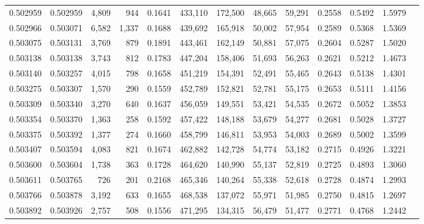 \begin{tabular}{rrrrrrrrrrrrr}
0.502959 & 0.502959 & 4,809 &   944 &                                     0.1641 & 433,110 & 172,500 &  48,665 &  59,291 & 0.2558 & 0.5492 & 1.5979 \\
0.502966 & 0.503071 & 6,582 & 1,337 &                                     0.1688 & 439,692 & 165,918 &  50,002 &  57,954 & 0.2589 & 0.5368 & 1.5369 \\
0.503075 & 0.503131 & 3,769 &   879 &                                     0.1891 & 443,461 & 162,149 &  50,881 &  57,075 & 0.2604 & 0.5287 & 1.5020 \\
0.503138 & 0.503138 & 3,743 &   812 &                                     0.1783 & 447,204 & 158,406 &  51,693 &  56,263 & 0.2621 & 0.5212 & 1.4673 \\
0.503140 & 0.503257 & 4,015 &   798 &                                     0.1658 & 451,219 & 154,391 &  52,491 &  55,465 & 0.2643 & 0.5138 & 1.4301 \\
0.503275 & 0.503307 & 1,570 &   290 &                                     0.1559 & 452,789 & 152,821 &  52,781 &  55,175 & 0.2653 & 0.5111 & 1.4156 \\
0.503309 & 0.503340 & 3,270 &   640 &                                     0.1637 & 456,059 & 149,551 &  53,421 &  54,535 & 0.2672 & 0.5052 & 1.3853 \\
0.503354 & 0.503370 & 1,363 &   258 &                                     0.1592 & 457,422 & 148,188 &  53,679 &  54,277 & 0.2681 & 0.5028 & 1.3727 \\
0.503375 & 0.503392 & 1,377 &   274 &                                     0.1660 & 458,799 & 146,811 &  53,953 &  54,003 & 0.2689 & 0.5002 & 1.3599 \\
0.503407 & 0.503594 & 4,083 &   821 &                                     0.1674 & 462,882 & 142,728 &  54,774 &  53,182 & 0.2715 & 0.4926 & 1.3221 \\
0.503600 & 0.503604 & 1,738 &   363 &                                     0.1728 & 464,620 & 140,990 &  55,137 &  52,819 & 0.2725 & 0.4893 & 1.3060 \\
0.503611 & 0.503765 &   726 &   201 &                                     0.2168 & 465,346 & 140,264 &  55,338 &  52,618 & 0.2728 & 0.4874 & 1.2993 \\
0.503766 & 0.503878 & 3,192 &   633 &                                     0.1655 & 468,538 & 137,072 &  55,971 &  51,985 & 0.2750 & 0.4815 & 1.2697 \\
0.503892 & 0.503926 & 2,757 &   508 &                                     0.1556 & 471,295 & 134,315 &  56,479 &  51,477 & 0.2771 & 0.4768 & 1.2442 \\

\end{tabular}
